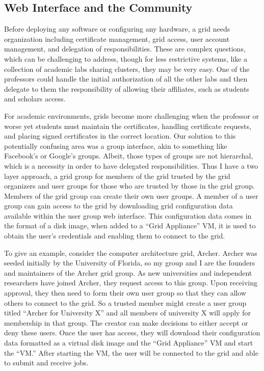 \addtocounter{footnote}{1}
\addtocounter{footnote}{1}
\addtocounter{footnote}{1}

\subsection{Web Interface and the Community}

Before deploying any software or configuring any hardware, a grid needs
organization including certificate management, grid access, user account
management, and delegation of responsibilities.  These are complex questions,
which can be challenging to address, though for less restrictive systems, like
a collection of academic labs sharing clusters, they may be very easy.  One of
the professors could handle the initial authorization of all the other labs and
then delegate to them the responsibility of allowing their affiliates, such as
students and scholars access.

For academic environments, grids become more challenging when the professor or
worse yet students must maintain the certificates, handling certificate
requests, and placing signed certificates in the correct location.  Our
solution to this potentially confusing area was a group interface, akin to
something like Facebook's or Google's groups.  Albeit, those types of groups
are not hierarchal, which is a necessity in order to have delegated
responsibilities.  Thus I have a two layer approach, a grid group for members
of the grid trusted by the grid organizers and user groups for those who are
trusted by those in the grid group.  Members of the grid group can create their
own user groups.  A member of a user group can gain access to the grid by
downloading grid configuration data available within the user group web
interface.  This configuration data comes in the format of a disk image, when
added to a ``Grid Appliance'' VM, it is used to obtain the user's credentials
and enabling them to connect to the grid.

To give an example, consider the computer architecture grid, Archer.  Archer
was seeded initially by the University of Florida, so my group and I are the
founders and maintainers of the Archer grid group.  As new universities and
independent researchers have joined Archer, they request access to this group.
Upon receiving approval, they then need to form their own user group so that
they can allow others to connect to the grid.  So a trusted member might create
a user group titled ``Archer for University X'' and all members of university X
will apply for membership in that group.  The creator can make decisions to
either accept or deny these users.  Once the user has access, they will
download their configuration data formatted as a virtual disk image and the
``Grid Appliance'' VM and start the ``VM.''  After starting the VM, the user
will be connected to the grid and able to submit and receive jobs.

